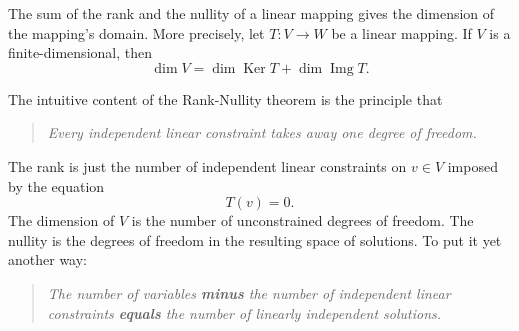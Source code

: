 \documentclass[12pt]{article}
\begin{document}
The sum of the rank and the nullity of a linear mapping gives
the dimension of the mapping's domain. More precisely, let
$T:V\rightarrow W$ be a linear mapping. If $V$ is a
finite-dimensional, then
$$\dim V = \dim \mathop{\mathrm{Ker}} T + \dim \mathop{\mathrm{Img}}
T.$$

The intuitive content of the Rank-Nullity theorem is the principle that
\begin{quote}\em
  Every independent linear constraint takes away one degree of freedom.
\end{quote}
The rank is just the number of independent linear constraints on $v\in
V$ imposed
by the equation
$$T(v)=0.$$
The dimension of $V$ is the number of unconstrained degrees of freedom.
The nullity is the degrees of freedom in the resulting space of
solutions.
To put it yet another way:
\begin{quote} \em
  The number of variables {\bf minus} the number of independent linear
  constraints {\bf equals} 
 the number of linearly independent solutions.
\end{quote}
\end{document}
